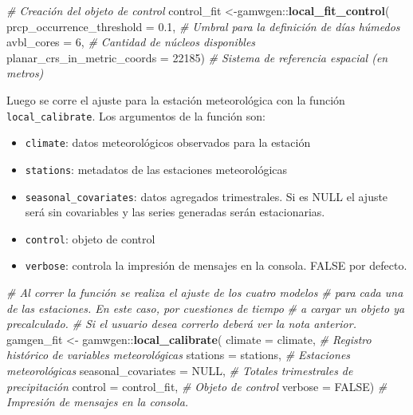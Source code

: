 \documentclass[
  12pt]{article}
\newenvironment{Shaded}{}{}
\newcommand{\CommentTok}[1]{\textcolor[rgb]{0.38,0.63,0.69}{\textit{#1}}}
\newcommand{\DataTypeTok}[1]{\textcolor[rgb]{0.56,0.13,0.00}{#1}}
\newcommand{\DecValTok}[1]{\textcolor[rgb]{0.25,0.63,0.44}{#1}}
\newcommand{\FloatTok}[1]{\textcolor[rgb]{0.25,0.63,0.44}{#1}}
\newcommand{\KeywordTok}[1]{\textcolor[rgb]{0.00,0.44,0.13}{\textbf{#1}}}
\newcommand{\NormalTok}[1]{#1}
\newcommand{\OperatorTok}[1]{\textcolor[rgb]{0.40,0.40,0.40}{#1}}
\newcommand{\OtherTok}[1]{\textcolor[rgb]{0.00,0.44,0.13}{#1}}
\newcommand{\StringTok}[1]{\textcolor[rgb]{0.25,0.44,0.63}{#1}}
\providecommand{\tightlist}{%
  \setlength{\itemsep}{0pt}\setlength{\parskip}{0pt}}
\begin{document}
\begin{Shaded}
\begin{Highlighting}[]
\CommentTok{# Creación del objeto de control}
\NormalTok{control_fit <-gamwgen}\OperatorTok{::}\KeywordTok{local_fit_control}\NormalTok{(}
  \DataTypeTok{prcp_occurrence_threshold =} \FloatTok{0.1}\NormalTok{, }
  \CommentTok{# Umbral para la definición de días húmedos}
  \DataTypeTok{avbl_cores =} \DecValTok{6}\NormalTok{, }
  \CommentTok{# Cantidad de núcleos disponibles}
  \DataTypeTok{planar_crs_in_metric_coords =} \DecValTok{22185}\NormalTok{) }
  \CommentTok{# Sistema de referencia espacial (en metros)}
\end{Highlighting}
\end{Shaded}

Luego se corre el ajuste para la estación meteorológica con la función \texttt{local\_calibrate}. Los argumentos de la función son:

\begin{itemize}
\tightlist
\item
  \texttt{climate}: datos meteorológicos observados para la estación
\item
  \texttt{stations}: metadatos de las estaciones meteorológicas
\item
  \texttt{seasonal\_covariates}: datos agregados trimestrales. Si es NULL el ajuste será sin covariables y las series generadas serán estacionarias.
\item
  \texttt{control}: objeto de control
\item
  \texttt{verbose}: controla la impresión de mensajes en la consola. FALSE por defecto.
\end{itemize}

\begin{Shaded}
\begin{Highlighting}[]
\CommentTok{# Al correr la función se realiza el ajuste de los cuatro modelos }
\CommentTok{# para cada una de las estaciones. En este caso, por cuestiones de tiempo}
\CommentTok{# a cargar un objeto ya precalculado. }
\CommentTok{# Si el usuario desea correrlo deberá ver la nota anterior.}
\NormalTok{gamgen_fit <-}\StringTok{ }\NormalTok{gamwgen}\OperatorTok{::}\KeywordTok{local_calibrate}\NormalTok{(}
  \DataTypeTok{climate =}\NormalTok{ climate, }
  \CommentTok{# Registro histórico de variables meteorológicas}
  \DataTypeTok{stations =}\NormalTok{ stations, }
  \CommentTok{# Estaciones meteorológicas }
  \DataTypeTok{seasonal_covariates =} \OtherTok{NULL}\NormalTok{, }
  \CommentTok{# Totales trimestrales de precipitación}
  \DataTypeTok{control =}\NormalTok{ control_fit, }
  \CommentTok{# Objeto de control}
  \DataTypeTok{verbose =} \OtherTok{FALSE}\NormalTok{) }
  \CommentTok{# Impresión de mensajes en la consola.}
\end{Highlighting}
\end{Shaded}
\end{document}
